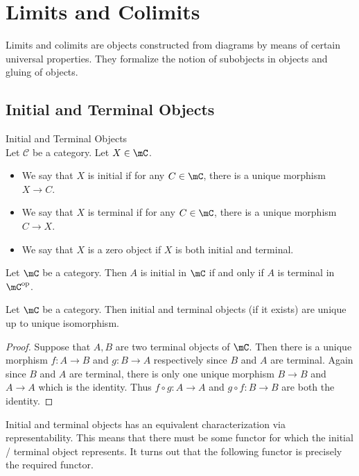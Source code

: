 \documentclass[a4paper]{article}
\begin{document}
\pagebreak
\section{Limits and Colimits}
Limits and colimits are objects constructed from diagrams by means of certain universal properties. They formalize the notion of subobjects in objects and gluing of objects. 

\subsection{Initial and Terminal Objects}
\begin{defn}{Initial and Terminal Objects}{}\\
Let $\mathcal{C}$ be a category. Let $X\in\mC$. 
\begin{itemize}
\item We say that $X$ is initial if for any $C\in\mC$, there is a unique morphism $X\to C$. 
\item We say that $X$ is terminal if for any $C\in\mC$, there is a unique morphism $C\to X$. 
\item We say that $X$ is a zero object if $X$ is both initial and terminal. 
\end{itemize}
\end{defn}

\begin{lmm}{}{} Let $\mC$ be a category. Then $A$ is initial in $\mC$ if and only if $A$ is terminal in $\mC^{\text{op}}$. 
\end{lmm}

\begin{prp}{}{} Let $\mC$ be a category. Then initial and terminal objects (if it exists) are unique up to unique isomorphism. 
\begin{proof}
Suppose that $A,B$ are two terminal objects of $\mC$. Then there is a unique morphism $f:A\to B$ and $g:B\to A$ respectively since $B$ and $A$ are terminal. Again since $B$ and $A$ are terminal, there is only one unique morphism $B\to B$ and $A\to A$ which is the identity. Thus $f\circ g:A\to A$ and $g\circ f:B\to B$ are both the identity. 
\end{proof}
\end{prp}

Initial and terminal objects has an equivalent characterization via representability. This means that there must be some functor for which the initial / terminal object represents. It turns out that the following functor is precisely the required functor. 
\end{document}
